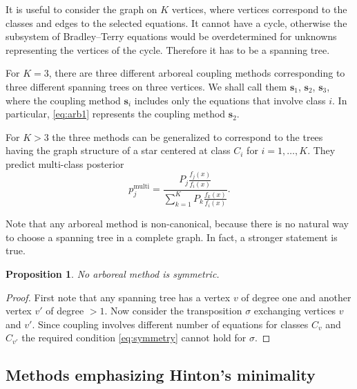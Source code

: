 \documentclass[pdflatex, sn-basic]{sn-jnl}%
\newtheorem{prop}{Proposition}
\theoremstyle{thmstyleone}%
\theoremstyle{thmstyletwo}%
\theoremstyle{thmstylethree}%
\begin{document}
It is useful to consider the graph on $K$ vertices, where vertices correspond to the classes and edges to the selected equations. It cannot have a cycle, otherwise the subsystem of Bradley--Terry equations would be overdetermined for unknowns representing the vertices of the cycle. Therefore it has to be a spanning tree.

For $K=3$, there are three different arboreal coupling methods corresponding to three different spanning trees on three vertices.
We shall call them $\boldsymbol{s}_1$, $\boldsymbol{s}_2$, $\boldsymbol{s}_3$, where the coupling method $\boldsymbol{s}_i$ 
includes only the equations that involve class $i$. 
In particular, \eqref{eq:arb1} represents the coupling method $\boldsymbol{s}_2$.

For $K>3$ the three methods can be generalized to correspond to the trees having the graph structure  of a star centered at class $C_i$ for $i=1, \ldots, K$. They predict multi-class posterior
$$
p_j^\textrm{multi} = \frac{P_j \frac{f_j(x)}{f_i(x)}}{\sum_{k=1}^K P_k \frac{f_k(x)}{f_i(x)}}.
$$


Note that any arboreal method is non-canonical, because there is no natural way to choose a spanning tree in a complete graph. 
In fact, a stronger statement is true.
\begin{prop}
No arboreal method is symmetric. 
\end{prop}
\begin{proof}
First note that any spanning tree has a vertex $v$ of degree one and another vertex $v'$ of degree $>1$. Now consider the transposition $\sigma$ exchanging  vertices $v$  and $v'$. Since coupling involves different number of equations for classes $C_v$ and $C_{v'}$ the required condition \eqref{eq:symmetry} cannot hold for $\sigma$.
\end{proof}


\subsection{Methods emphasizing Hinton's minimality}
\end{document}
